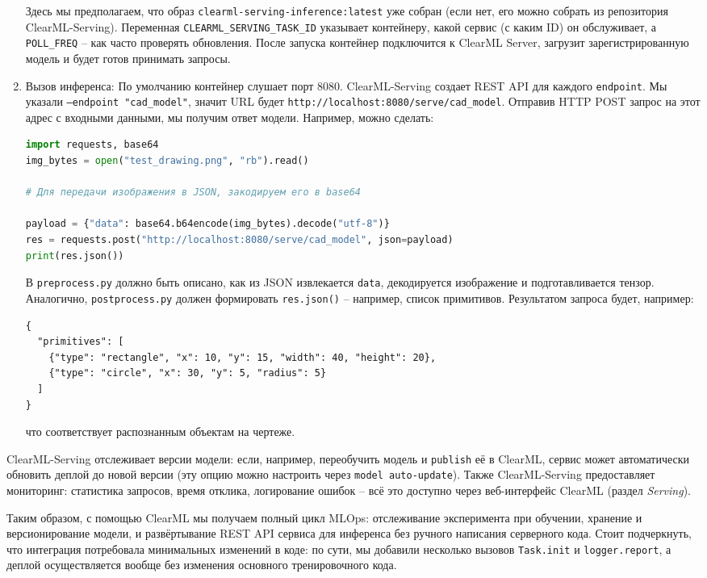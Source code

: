 \documentclass{article}
\begin{document}
\begin{enumerate}
\begin{verbatim}
\end{verbatim}
Здесь мы предполагаем, что образ \texttt{clearml-serving-inference:latest} уже собран (если нет, его можно собрать из репозитория ClearML-Serving). Переменная \texttt{CLEARML_SERVING_TASK_ID} указывает контейнеру, какой сервис (с каким ID) он обслуживает, а \texttt{POLL_FREQ} – как часто проверять обновления. После запуска контейнер подключится к ClearML Server, загрузит зарегистрированную модель и будет готов принимать запросы.
\item Вызов инференса: По умолчанию контейнер слушает порт 8080. ClearML-Serving создает REST API для каждого \texttt{endpoint}. Мы указали \texttt{--endpoint "cad_model"}, значит URL будет \verb|http://localhost:8080/serve/cad_model|. Отправив HTTP POST запрос на этот адрес с входными данными, мы получим ответ модели. Например, можно сделать:
\begin{lstlisting}[language=Python]
import requests, base64
img_bytes = open("test_drawing.png", "rb").read()

# Для передачи изображения в JSON, закодируем его в base64

payload = {"data": base64.b64encode(img_bytes).decode("utf-8")}
res = requests.post("http://localhost:8080/serve/cad_model", json=payload)
print(res.json())
\end{lstlisting}
В \texttt{preprocess.py} должно быть описано, как из JSON извлекается \texttt{data}, декодируется изображение и подготавливается тензор. Аналогично, \texttt{postprocess.py} должен формировать \texttt{res.json()} – например, список примитивов. Результатом запроса будет, например:
\begin{verbatim}
{
  "primitives": [
    {"type": "rectangle", "x": 10, "y": 15, "width": 40, "height": 20},
    {"type": "circle", "x": 30, "y": 5, "radius": 5}
  ]
}
\end{verbatim}
что соответствует распознанным объектам на чертеже.
\end{enumerate}

ClearML-Serving отслеживает версии модели: если, например, переобучить модель и \texttt{publish} её в ClearML, сервис может автоматически обновить деплой до новой версии (эту опцию можно настроить через \texttt{model auto-update}). Также ClearML-Serving предоставляет мониторинг: статистика запросов, время отклика, логирование ошибок – всё это доступно через веб-интерфейс ClearML (раздел \textit{Serving}).

Таким образом, с помощью ClearML мы получаем полный цикл MLOps: отслеживание эксперимента при обучении, хранение и версионирование модели, и развёртывание REST API сервиса для инференса без ручного написания серверного кода. Стоит подчеркнуть, что интеграция потребовала минимальных изменений в коде: по сути, мы добавили несколько вызовов \texttt{Task.init} и \texttt{logger.report}, а деплой осуществляется вообще без изменения основного тренировочного кода.
\end{document}
